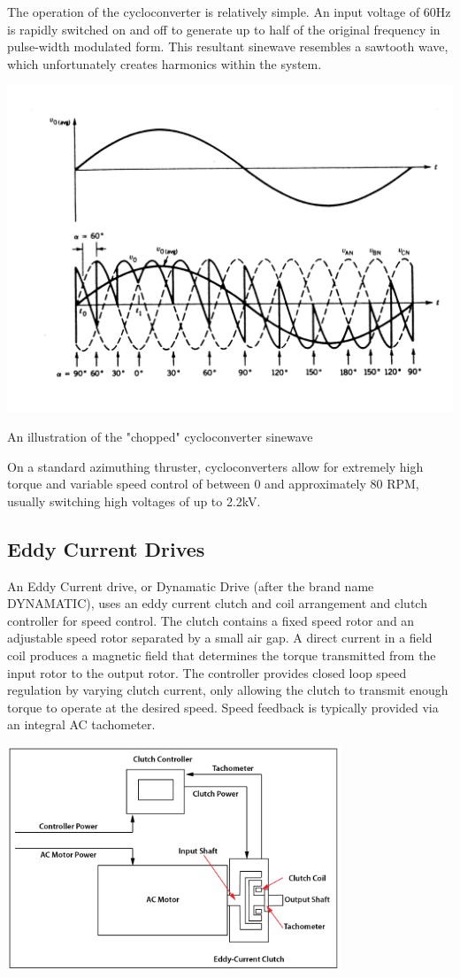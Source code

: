 \documentclass[11pt,a4paper]{article}
\begin{document}
The operation of the cycloconverter is relatively simple. An input voltage of 60Hz is rapidly switched on and off to generate up to half of the original frequency in pulse-width modulated form. This resultant sinewave resembles a sawtooth wave, which unfortunately creates harmonics within the system.
\begin{center}
\includegraphics[width=14cm]{cyclo.png}\par
An illustration of the "chopped" cycloconverter sinewave
\end{center}

On a standard azimuthing thruster, cycloconverters allow for extremely high torque and variable speed control of between 0 and approximately 80 RPM, usually switching high voltages of up to 2.2kV.
\subsection{Eddy Current Drives}
An Eddy Current drive, or Dynamatic Drive (after the brand name DYNAMATIC), uses an eddy current clutch and coil arrangement and clutch controller for speed control. The clutch contains a fixed speed rotor and an adjustable speed rotor separated by a small air gap. A direct current in a field coil produces a magnetic field that determines the torque transmitted from the input rotor to the output rotor. The controller provides closed loop speed regulation by varying clutch current, only allowing the clutch to transmit enough torque to operate at the desired speed. Speed feedback is typically provided via an integral AC tachometer.
\begin{center}
\includegraphics[width=10cm]{dynamatic.png}
\end{center}
\end{document}

